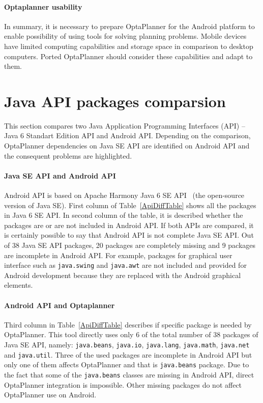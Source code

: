 \paragraph{Optaplanner usability}
In summary, it is necessary to prepare OptaPlanner for the Android platform to enable possibility of using tools for
solving planning problems. Mobile devices have limited computing capabilities and storage space in comparison to desktop
computers. Ported OptaPlanner should consider these capabilities and adapt to them.

\section{Java API packages comparsion}\label{ComparsionSection}
This section compares two Java Application Programming Interfaces (API) -- Java 6 Standart Edition API and Android API.
Depending on the comparison, OptaPlanner dependencies on Java SE API are identified on Android API and the consequent
problems are highlighted.

\paragraph{Java SE API and Android API}
Android API is based on Apache Harmony Java 6 SE API~\cite{Apache} (the open-source version of Java SE). First column of
Table~\ref{ApiDiffTable} shows all the packages in Java 6 SE API. In second column of the table, it is described whether
the packages are or are not included in Android API. If both APIs are compared, it is certainly possible to say that
Android API is not complete Java SE API. Out of 38 Java SE API packages, 20 packages are completely missing and 9
packages are incomplete in Android API. For example, packages for graphical user interface such as \texttt{java.swing}
and \texttt{java.awt} are not included and provided for Android development because they are replaced with the Android
graphical elements.

\paragraph{Android API and Optaplanner}
Third column in Table~\ref{ApiDiffTable} describes if specific package is needed by OptaPlanner. This tool directly uses
only 6 of the total number of 38 packages of Java SE API, namely: \texttt{java.beans}, \texttt{java.io},
\texttt{java.lang}, \texttt{java.math}, \texttt{java.net} and \texttt{java.util}. Three of the used packages are
incomplete in Android API but only one of them affects OptaPlanner and that is \texttt{java.beans} package. Due to the
fact that some of the \texttt{java.beans} classes are missing in Android API, direct OptaPlanner integration is
impossible. Other missing packages do not affect OptaPlanner use on Android.

